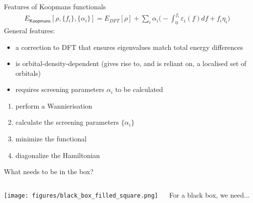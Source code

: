 \documentclass[xcolor=table,aspectratio=169]{beamer}
\numberwithin{equation}{section}
\begin{document}
\begin{frame}{Features of Koopmans functionals}
   \begin{align*}
      E_\mathsf{Koopmans}[\rho,{\{f_i\}}, {\{\alpha_i\}}]
      = {E_{DFT}[\rho]}
      + \sum_i
      {\alpha_i}
      \Biggl(
      -
      {\int^{f_i}_{0} \varepsilon_i(f) df}
      +
      {f_i {\eta_i}}
      \Biggr)
   \end{align*}
   General features:
   \begin{itemize}[<+(1)->]
      \item a correction to DFT that ensures eigenvalues match total energy differences
      \item is orbital-density-dependent (gives rise to, and is reliant on, a localised set of orbitals)
      \item requires screening parameters $\alpha_i$ to be calculated
   \end{itemize}

   \begin{enumerate}[<+(2)->]
      \item perform a Wannierisation
      \item calculate the screening parameters $\{\alpha_i\}$
      \item minimize the functional
      \item diagonalize the Hamiltonian
   \end{enumerate}

\end{frame}

\begin{frame}{What needs to be in the box?}

   \begin{columns}
      \begin{column}{0.5\textwidth}
         \texttt{[image: figures/black\_box\_filled\_square.png]}
      \end{column}
      \begin{column}{0.5\textwidth}
         For a black box, we need...

         \vspace{1ex}

         \vspace{1ex}
      \end{column}
   \end{columns}
\end{frame}
\end{document}
